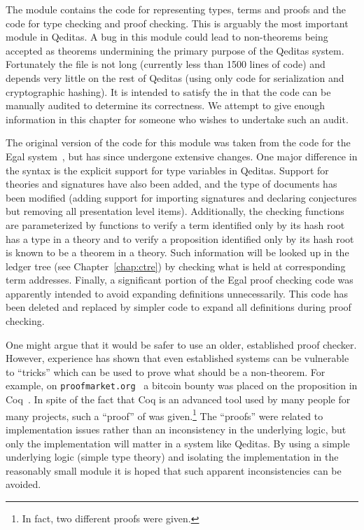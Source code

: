 The {} module contains the code for representing types,
terms and proofs
and the code for type checking and proof checking.
This is arguably the most important module in Qeditas.
A bug in this module could lead to non-theorems being accepted as theorems
undermining the primary purpose of the Qeditas system.
Fortunately the {} file is not long (currently less than 1500 lines of code)
and depends very little on the rest of Qeditas (using only
code for serialization and cryptographic hashing).
It is intended to satisfy the {}
in that the code can be manually audited to determine its correctness.
We attempt to give enough information in this chapter for someone who wishes to undertake such an audit.

The original version of the code for this module was taken from the code for the
Egal system~\cite{Brown2014},
but has since undergone extensive changes.
One major difference in the syntax is the explicit support for type variables in Qeditas.
Support for theories and signatures have also been added, and the type of documents has been modified
(adding support for importing signatures and declaring conjectures but removing all presentation level items).
Additionally, the checking functions are parameterized by functions to verify a term
identified only by its hash root has a type in a theory
and to verify a proposition identified only by its hash root is known to be a theorem in a theory.
Such information will be looked up in the ledger tree (see Chapter~\ref{chap:ctre}) by checking what is held at corresponding term addresses.
Finally, a significant portion of the Egal proof checking code was apparently
intended to avoid expanding definitions unnecessarily.
This code has been deleted and replaced by
simpler code to expand all definitions during proof checking.

One might argue that it would be safer to use an older, established proof checker.
However, experience has shown that even established systems can be vulnerable to ``tricks''
which can be used to prove what should be a non-theorem.
For example, on {\tt{proofmarket.org}}~\cite{ProofMarket}
a bitcoin bounty was placed on the proposition {} in Coq~\cite{Coq:manual}.
In spite of the fact that Coq is an advanced tool used by many people for many projects,
such a ``proof'' of {} was given.\footnote{In fact, two different proofs were given.}
The ``proofs'' were related to implementation issues rather than an inconsistency
in the underlying logic, but only the implementation will matter in a system like Qeditas.
By using a simple underlying logic (simple type theory)
and isolating the implementation in the reasonably small module {}
it is hoped that such apparent inconsistencies can be avoided.

